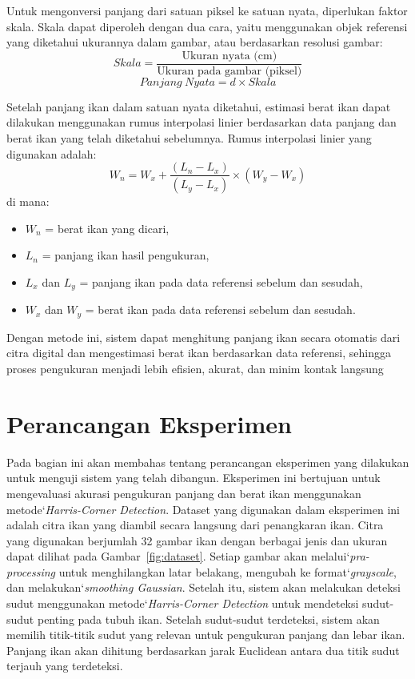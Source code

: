     Untuk mengonversi panjang dari satuan piksel ke satuan nyata, diperlukan faktor skala. Skala dapat diperoleh dengan dua cara, yaitu menggunakan objek referensi yang diketahui ukurannya dalam gambar, atau berdasarkan resolusi gambar:
\begin{equation*}
    Skala = \frac{\text{Ukuran nyata (cm)}}{\text{Ukuran pada gambar (piksel)}}
\end{equation*}
\begin{equation}
    Panjang\ Nyata = d \times Skala
\end{equation}

    Setelah panjang ikan dalam satuan nyata diketahui, estimasi berat ikan dapat dilakukan menggunakan rumus interpolasi linier berdasarkan data panjang dan berat ikan yang telah diketahui sebelumnya. Rumus interpolasi linier yang digunakan adalah:
\begin{equation}
    W_n = W_x + \frac{(L_n - L_x)}{(L_y - L_x)} \times (W_y - W_x)
\end{equation}
    di mana:
\begin{itemize}
    \item \(W_n\) = berat ikan yang dicari,
    \item \(L_n\) = panjang ikan hasil pengukuran,
    \item \(L_x\) dan \(L_y\) = panjang ikan pada data referensi sebelum dan sesudah,
    \item \(W_x\) dan \(W_y\) = berat ikan pada data referensi sebelum dan sesudah.
\end{itemize}

    Dengan metode ini, sistem dapat menghitung panjang ikan secara otomatis dari citra digital dan mengestimasi berat ikan berdasarkan data referensi, sehingga proses pengukuran menjadi lebih efisien, akurat, dan minim kontak langsung

\section{Perancangan Eksperimen}
   Pada bagian ini akan membahas tentang perancangan eksperimen yang dilakukan untuk menguji sistem yang telah dibangun. Eksperimen ini bertujuan untuk mengevaluasi akurasi pengukuran panjang dan berat ikan menggunakan metode`\emph{Harris-Corner Detection}.
   Dataset yang digunakan dalam eksperimen ini adalah citra ikan yang diambil secara langsung dari penangkaran ikan.
   Citra yang digunakan berjumlah 32 gambar ikan dengan berbagai jenis dan ukuran dapat dilihat pada Gambar~\ref{fig:dataset}.
   Setiap gambar akan melalui`\emph{pra-processing} untuk menghilangkan latar belakang, mengubah ke format`\emph{grayscale}, dan melakukan`\emph{smoothing Gaussian}.
   Setelah itu, sistem akan melakukan deteksi sudut menggunakan metode`\emph{Harris-Corner Detection} untuk mendeteksi sudut-sudut penting pada tubuh ikan.
   Setelah sudut-sudut terdeteksi, sistem akan memilih titik-titik sudut yang relevan untuk pengukuran panjang dan lebar ikan.
   Panjang ikan akan dihitung berdasarkan jarak Euclidean antara dua titik sudut terjauh yang terdeteksi.
    
